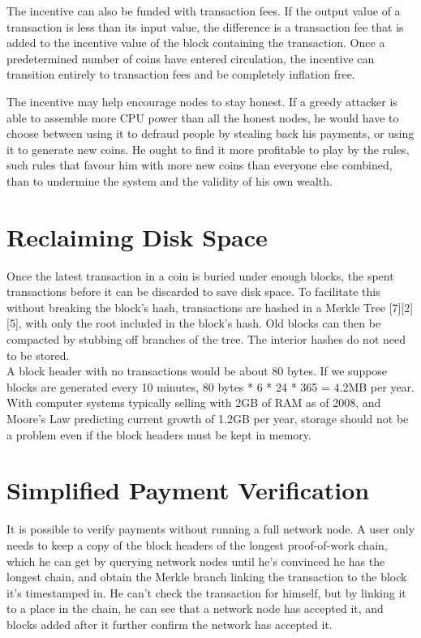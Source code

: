 \documentclass{article}
\begin{document}
The incentive can also be funded with transaction fees.
If the output value of a transaction is
less than its input value, the difference is a transaction fee that is added to the incentive value of
the block containing the transaction.
Once a predetermined number of coins have entered
circulation, the incentive can transition entirely to transaction fees and be completely inflation
free.

The incentive may help encourage nodes to stay honest.
If a greedy attacker is able to
assemble more CPU power than all the honest nodes, he would have to choose between using it
to defraud people by stealing back his payments, or using it to generate new coins.
He ought to find it more profitable to play by the rules, such rules that favour him with more new coins than
everyone else combined, than to undermine the system and the validity of his own wealth.

\section{Reclaiming Disk Space}\label{sec:reclaiming-disk-space}
Once the latest transaction in a coin is buried under enough blocks, the spent transactions before
it can be discarded to save disk space.
To facilitate this without breaking the block's hash,
transactions are hashed in a Merkle Tree [7][2][5], with only the root included in the block's hash.
Old blocks can then be compacted by stubbing off branches of the tree.
The interior hashes do not need to be stored.\\



A block header with no transactions would be about 80 bytes.
If we suppose blocks are generated every 10 minutes, 80 bytes * 6 * 24 * 365 = 4.2MB per year.
With computer systems typically selling with 2GB of RAM as of 2008, and Moore's Law predicting current growth of
1.2GB per year, storage should not be a problem even if the block headers must be kept in memory.

\section{Simplified Payment Verification}\label{sec:simplified-payment-verification}
It is possible to verify payments without running a full network node.
A user only needs to keep a copy of the block headers of the longest proof-of-work chain,
which he can get by querying network nodes until he's convinced he has the longest chain,
and obtain the Merkle branch linking the transaction to the block it's timestamped in.
He can't check the transaction for himself,
but by linking it to a place in the chain,
he can see that a network node has accepted it,
and blocks added after it further confirm the network has accepted it. \\
\end{document}

